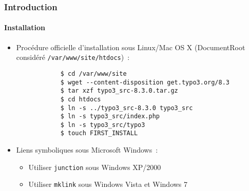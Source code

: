 \begin{frame}[fragile]
	\frametitle{Introduction}
	\framesubtitle{Installation}

	\begin{itemize}
		\item Procédure officielle d'installation sous Linux/Mac OS X\newline
			(DocumentRoot considéré \texttt{/var/www/site/htdocs})~:
		\begin{lstlisting}
			$ cd /var/www/site
			$ wget --content-disposition get.typo3.org/8.3
			$ tar xzf typo3_src-8.3.0.tar.gz
			$ cd htdocs
			$ ln -s ../typo3_src-8.3.0 typo3_src
			$ ln -s typo3_src/index.php
			$ ln -s typo3_src/typo3
			$ touch FIRST_INSTALL
		\end{lstlisting}

		\item Liens symboliques sous Microsoft Windows~:

			\begin{itemize}
				\item Utiliser \texttt{junction} sous Windows XP/2000
				\item Utiliser \texttt{mklink} sous Windows Vista et Windows 7
			\end{itemize}

	\end{itemize}
\end{frame}

